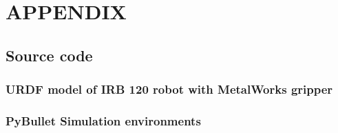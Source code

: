 \chapter*{APPENDIX}

\section*{Source code}
\subsection*{URDF model of IRB 120 robot with MetalWorks gripper}











\subsection*{PyBullet Simulation environments}







